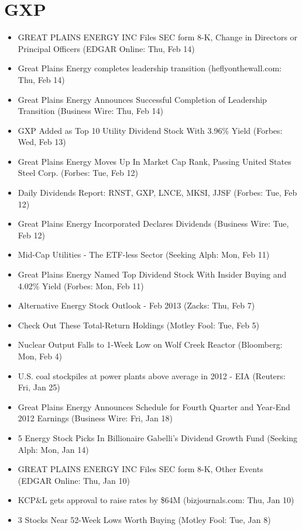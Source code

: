 \documentclass[11pt,asymmetric]{article}
\begin{document}
\section*{GXP}
\begin{itemize}
\item GREAT PLAINS ENERGY INC Files SEC form 8-K, Change in Directors or Principal Officers (EDGAR Online: Thu, Feb 14)
\item Great Plains Energy completes leadership transition (heflyonthewall.com: Thu, Feb 14)
\item Great Plains Energy Announces Successful Completion of Leadership Transition (Business Wire: Thu, Feb 14)
\item GXP Added as Top 10 Utility Dividend Stock With 3.96\% Yield (Forbes: Wed, Feb 13)
\item Great Plains Energy Moves Up In Market Cap Rank, Passing United States Steel Corp. (Forbes: Tue, Feb 12)
\item Daily Dividends Report: RNST, GXP, LNCE, MKSI, JJSF (Forbes: Tue, Feb 12)
\item Great Plains Energy Incorporated Declares Dividends (Business Wire: Tue, Feb 12)
\item Mid-Cap Utilities - The ETF-less Sector (Seeking Alph: Mon, Feb 11)
\item Great Plains Energy Named Top Dividend Stock With Insider Buying and 4.02\% Yield (Forbes: Mon, Feb 11)
\item Alternative Energy Stock Outlook - Feb 2013 (Zacks: Thu, Feb 7)
\item Check Out These Total-Return Holdings (Motley Fool: Tue, Feb 5)
\item Nuclear Output Falls to 1-Week Low on Wolf Creek Reactor (Bloomberg: Mon, Feb 4)
\item U.S. coal stockpiles at power plants above average in 2012 - EIA (Reuters: Fri, Jan 25)
\item Great Plains Energy Announces Schedule for Fourth Quarter and Year-End 2012 Earnings (Business Wire: Fri, Jan 18)
\item 5 Energy Stock Picks In Billionaire Gabelli's Dividend Growth Fund (Seeking Alph: Mon, Jan 14)
\item GREAT PLAINS ENERGY INC Files SEC form 8-K, Other Events (EDGAR Online: Thu, Jan 10)
\item KCP\&L gets approval to raise rates by \$64M (bizjournals.com: Thu, Jan 10)
\item 3 Stocks Near 52-Week Lows Worth Buying (Motley Fool: Tue, Jan 8)

\end{itemize}
\end{document}
